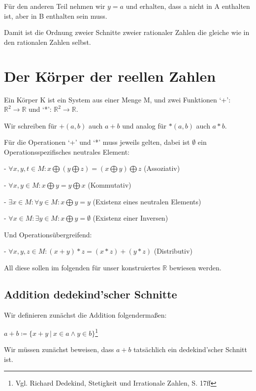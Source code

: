 \documentclass[12pt]{article}
\begin{document}
    Für den anderen Teil nehmen wir $y = a$ und erhalten, dass a nicht in A enthalten ist, aber in B enthalten sein
    muss.

    Damit ist die Ordnung zweier Schnitte zweier rationaler Zahlen die gleiche wie in den rationalen Zahlen selbst.

    \newpage

    \section{Der Körper der reellen Zahlen}

    Ein Körper K ist ein System aus einer Menge M, und zwei Funktionen `+': $\mathbb{R}^2 \rightarrow \mathbb{R}$
    und `*': $\mathbb{R}^2 \rightarrow \mathbb{R}$.

    Wir schreiben für $+(a, b)$ auch $a + b$ und analog für $*(a, b)$ auch $a * b$.

    Für die Operationen `+' und `*' muss jeweils gelten, dabei ist $\emptyset$ ein Operationsspezifisches
    neutrales Element:

    - $\forall x, y, t \in M: x \bigoplus (y \bigoplus z) = (x \bigoplus y) \bigoplus z$  (Assoziativ)

    - $\forall x, y \in M: x \bigoplus y = y \bigoplus x$  (Kommutativ)

    - $\exists x \in M: \forall y \in M: x \bigoplus y = y$  (Existenz eines neutralen Elements)

    - $\forall x \in M: \exists y \in M: x \bigoplus y = \emptyset$  (Existenz einer Inversen)

    Und Operationsübergreifend:

    - $\forall x, y, z \in M: (x + y) * z = (x * z) + (y * z)$ (Distributiv)

    All diese sollen im folgenden für unser konstruiertes $\mathbb{R}$ bewiesen werden.

    \subsection{Addition dedekind'scher Schnitte}

    Wir definieren zunächst die Addition folgendermaßen:

    $a + b \coloneqq \{x + y \mspace{4mu} | \mspace{4mu} x \in a \land y \in b\}$\footnote{
        Vgl. Richard Dedekind, Stetigkeit und Irrationale Zahlen, S. 17ff
    }

    Wir müssen zunächst beweisen, dass $a + b$ tatsächlich ein dedekind'scher Schnitt ist.
\end{document}

